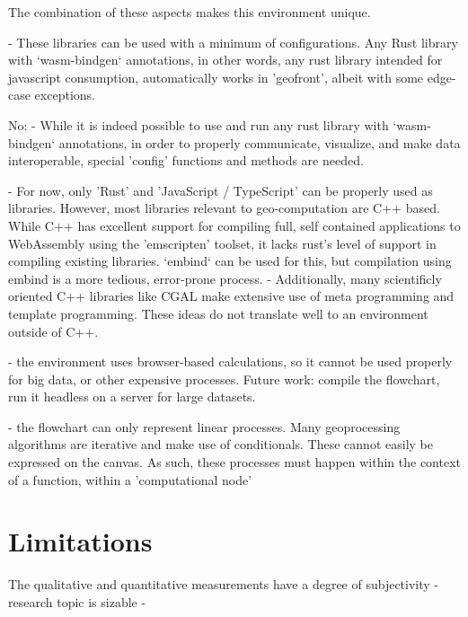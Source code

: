 \begin{note}
   The combination of these aspects makes this environment unique. 

- These libraries can be used with a minimum of configurations. Any Rust library with `wasm-bindgen` annotations, in other words, any rust library intended for javascript consumption, automatically works in 'geofront', albeit with some edge-case exceptions. 


No: 
 - While it is indeed possible to use and run any rust library with `wasm-bindgen` annotations, in order to properly communicate, visualize, and make data interoperable, special 'config' functions and methods are needed. 

 - For now, only 'Rust' and 'JavaScript / TypeScript' can be properly used as libraries. However, most libraries relevant to geo-computation are C++ based. While C++ has excellent support for compiling full, self contained applications to WebAssembly using the 'emscripten' toolset, it lacks rust's level of support in compiling existing libraries. `embind` can be used for this, but compilation using embind is a more tedious, error-prone process.   
   - Additionally, many scientificly oriented C++ libraries like CGAL make extensive use of meta programming and template programming. These ideas do not translate well to an environment outside of C++. 

 - the environment uses browser-based calculations, so it cannot be used properly for big data, or other expensive processes.
   Future work: compile the flowchart, run it headless on a server for large datasets.
 
 - the flowchart can only represent linear processes. Many geoprocessing algorithms are iterative and make use of conditionals. These cannot easily be expressed on the canvas. As such, these processes must happen within the context of a function, within a 'computational node'

\end{note}

\section{Limitations}

The qualitative and quantitative measurements have a degree of subjectivity
- research topic is sizable
- 




